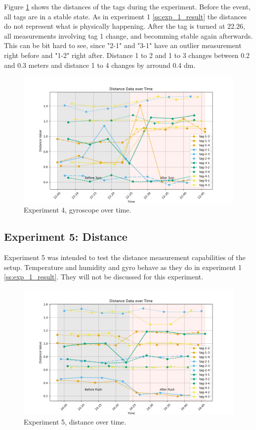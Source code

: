 Figure \ref{f:exp4_graphs_dist} shows the distances of the tags during the experiment.
Before the event, all tags are in a stable state.
As in experiment 1 \ref{ss:exp_1_result} the distances do not represent what is physically happening.
After the tag is turned at 22.26, all measurements involving tag 1 change, and becomming stable again afterwards.
This can be bit hard to see, since "2-1" and "3-1" have an outlier measurement right before and "1-2" right after.
Distance 1 to 2 and 1 to 3 changes between 0.2 and 0.3 meters and distance 1 to 4 changes by arround 0.4 dm.

\begin{figure}[ht!]
\includegraphics[width=\linewidth]{graphics/exp/exp4_dist_data_plot_1.png}
 \caption{Experiment 4, gyroscope over time.}
\label{f:exp4_graphs_dist}
\end{figure}


\subsection{Experiment 5: Distance}
\label{ss:exp_3_result}

Experiment 5 was intended to test the distance measurement capabilities of the setup.
Temperature and humidity and gyro behave as they do in experiment 1 \ref{ss:exp_1_result}.
They will not be discussed for this experiment.

\begin{figure}[ht!]
\includegraphics[width=\linewidth]{graphics/exp/exp5_dist_data_plot_2.png}
 \caption{Experiment 5, distance over time.}
\label{f:exp5_graphs_dist}
\end{figure}

